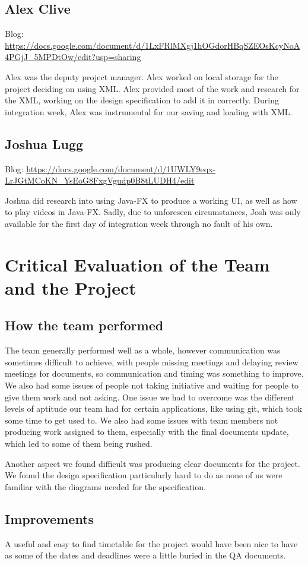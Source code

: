\documentclass[10pt,a4paper]{article}
\begin{document}
	\subsection{Alex Clive}
	Blog: \url{https://docs.google.com/document/d/1LxFRlMXgj1hOGdorHBqSZEOsKcyNoA4PGjJ_5MPDtOw/edit?usp=sharing}
	\par
	Alex  was the deputy project manager. Alex worked on local storage for the project deciding on using XML. Alex provided most of the work and research for the XML, working on the design specification to add it in correctly. During integration week, Alex was instrumental for our saving and loading with XML.
	\subsection{Joshua Lugg}
	Blog: \url{https://docs.google.com/document/d/1UWLY9eqx-LrJGtMCoKN_YsEoG8FxgVgudp0B8tLUDH4/edit}
	\par 
	Joshua did research into using Java-FX to produce a working UI, as well as how to play videos in Java-FX. Sadly, due to unforeseen circumstances, Josh was only available for the first day of integration week through no fault of his own.
	\newpage  
	\section{Critical Evaluation of the Team and the Project}
	\subsection{How the team performed}
	The team generally performed well as a whole, however communication was sometimes difficult to achieve, with people missing meetings and delaying review meetings for documents, so communication and timing was something to improve. We also had some issues of people not taking initiative and waiting for people to give them work and not asking. One issue we had to overcome was the different levels of aptitude our team had for certain applications, like using git, which took some time to get used to. We also had some issues with team members not producing work assigned to them, especially with the final documents update, which led to some of them being rushed.
	\par 
	Another aspect we found difficult was producing clear documents for the project. We found the design specification particularly hard to do as none of us were familiar with the diagrams needed for the specification.
	\subsection{Improvements}
	A useful and easy to find timetable for the project would have been nice to have as some of the dates and deadlines were a little buried in the QA documents.
\end{document}
